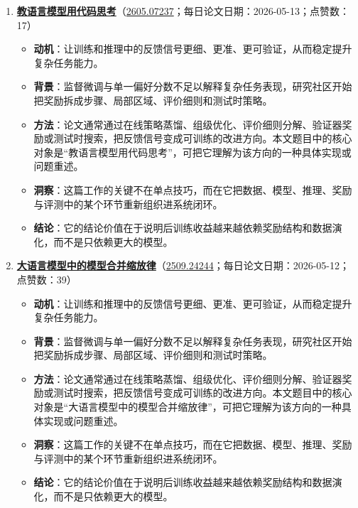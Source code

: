 \begin{enumerate}[leftmargin=1.5em]
\begin{itemize}[leftmargin=1.5em]
    \item \textbf{结论}：它的结论价值在于说明后训练收益越来越依赖奖励结构和数据演化，而不是只依赖更大的模型。
  \end{itemize}
  \item \textbf{\href{https://huggingface.co/papers/2605.07237}{教语言模型用代码思考}}（\href{https://arxiv.org/abs/2605.07237}{2605.07237}；每日论文日期：2026-05-13；点赞数：17）
  \begin{itemize}[leftmargin=1.5em]
    \item \textbf{动机}：让训练和推理中的反馈信号更细、更准、更可验证，从而稳定提升复杂任务能力。
    \item \textbf{背景}：监督微调与单一偏好分数不足以解释复杂任务表现，研究社区开始把奖励拆成步骤、局部区域、评价细则和测试时策略。
    \item \textbf{方法}：论文通常通过在线策略蒸馏、组级优化、评价细则分解、验证器奖励或测试时搜索，把反馈信号变成可训练的改进方向。本文题目中的核心对象是“教语言模型用代码思考”，可把它理解为该方向的一种具体实现或问题重述。
    \item \textbf{洞察}：这篇工作的关键不在单点技巧，而在它把数据、模型、推理、奖励与评测中的某个环节重新组织进系统闭环。
    \item \textbf{结论}：它的结论价值在于说明后训练收益越来越依赖奖励结构和数据演化，而不是只依赖更大的模型。
  \end{itemize}
  \item \textbf{\href{https://huggingface.co/papers/2509.24244}{大语言模型中的模型合并缩放律}}（\href{https://arxiv.org/abs/2509.24244}{2509.24244}；每日论文日期：2026-05-12；点赞数：39）
  \begin{itemize}[leftmargin=1.5em]
    \item \textbf{动机}：让训练和推理中的反馈信号更细、更准、更可验证，从而稳定提升复杂任务能力。
    \item \textbf{背景}：监督微调与单一偏好分数不足以解释复杂任务表现，研究社区开始把奖励拆成步骤、局部区域、评价细则和测试时策略。
    \item \textbf{方法}：论文通常通过在线策略蒸馏、组级优化、评价细则分解、验证器奖励或测试时搜索，把反馈信号变成可训练的改进方向。本文题目中的核心对象是“大语言模型中的模型合并缩放律”，可把它理解为该方向的一种具体实现或问题重述。
    \item \textbf{洞察}：这篇工作的关键不在单点技巧，而在它把数据、模型、推理、奖励与评测中的某个环节重新组织进系统闭环。
    \item \textbf{结论}：它的结论价值在于说明后训练收益越来越依赖奖励结构和数据演化，而不是只依赖更大的模型。

\end{itemize}
\end{enumerate}
